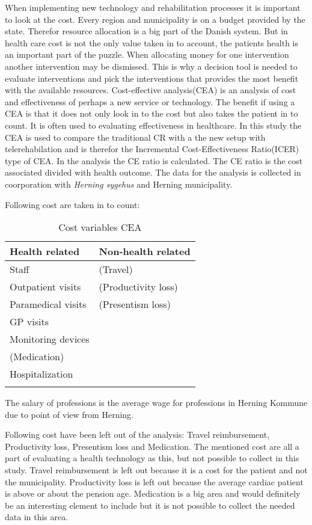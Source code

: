 When implementing new technology and rehabilitation processes it is important to look at the cost. Every region and municipality is on a budget provided by the state. Therefor resource allocation is a big part of the Danish system. But in health care cost is not the only value taken in to account, the patients health is an important part of the puzzle. When allocating money for one intervention another intervention may be dismissed. This is why a decision tool is needed to evaluate interventions and pick the interventions that provides the most benefit with the available resources.
Cost-effective analysis(CEA) is an analysis of cost and effectiveness of perhaps a new service or technology. The benefit if using a CEA is that it does not only look in to the cost but also takes the patient in to count. It is often used to evaluating effectiveness in healthcare. In this study the CEA is used to compare the traditional CR with a the new setup with telerehabilation and is therefor the Incremental Cost-Effectiveness Ratio(ICER) type of CEA. In the analysis the CE ratio is calculated. The CE ratio is the cost associated divided with health outcome.
The data for the analysis is collected in coorporation with \textit{Herning sygehus} and Herning municipality. 

Following cost are taken in to count:

\begin{longtabu} to 
	\textbf{Health related} & \textbf{Non-health related}\\[-1ex]
	\midrule
	Staff & (Travel) \\[-1ex]
	Outpatient visits & (Productivity loss) \\[-1ex]
	Paramedical visits & (Presentism loss)\\[-1ex]
	GP visits &  \\[-1ex]
	Monitoring devices &  \\[-1ex]
	(Medication) &  \\[-1ex]
	Hospitalization &  \\[-1ex]
	\hline
	\caption{Cost variables CEA}
\end{longtabu}

The salary of professions is the average wage for professions in Herning Kommune due to point of view from Herning. 


Following cost have been left out of the analysis: Travel reimbursement, Productivity loss, Presentism loss and Medication. The mentioned cost are all a part of evaluating a health technology as this, but not possible to collect in this study. Travel reimbursement is left out because it is a cost for the patient and not the municipality. Productivity loss is left out because the average cardiac patient is above or about the pension age. Medication is a big area and would definitely be an interesting element to include but it is not possible to collect the needed data in this area. 


